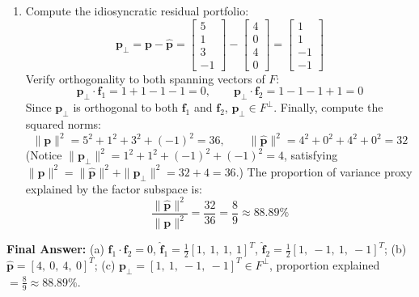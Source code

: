 \documentclass[11pt, letterpaper]{article}
\theoremstyle{definition}
\theoremstyle{remark}
\begin{document}
\begin{enumerate}[label=(\alph*)]
\[    \]
    Adding the two factor components gives the systematic portfolio projection:
    \[
    \hat{\mathbf{p}} = \begin{bmatrix} 2 \\ 2 \\ 2 \\ 2 \end{bmatrix} + \begin{bmatrix} 2 \\ -2 \\ 2 \\ -2 \end{bmatrix} = \begin{bmatrix} 4 \\ 0 \\ 4 \\ 0 \end{bmatrix}
    \]
    \item Compute the idiosyncratic residual portfolio:
    \[
    \mathbf{p}_{\perp} = \mathbf{p} - \hat{\mathbf{p}} = \begin{bmatrix} 5 \\ 1 \\ 3 \\ -1 \end{bmatrix} - \begin{bmatrix} 4 \\ 0 \\ 4 \\ 0 \end{bmatrix} = \begin{bmatrix} 1 \\ 1 \\ -1 \\ -1 \end{bmatrix}
    \]
    Verify orthogonality to both spanning vectors of $F$:
    \[
    \mathbf{p}_{\perp} \cdot \mathbf{f}_1 = 1 + 1 - 1 - 1 = 0, \qquad \mathbf{p}_{\perp} \cdot \mathbf{f}_2 = 1 - 1 - 1 + 1 = 0
    \]
    Since $\mathbf{p}_{\perp}$ is orthogonal to both $\mathbf{f}_1$ and $\mathbf{f}_2$, $\mathbf{p}_{\perp} \in F^{\perp}$. Finally, compute the squared norms:
    \[
    \|\mathbf{p}\|^2 = 5^2 + 1^2 + 3^2 + (-1)^2 = 36, \qquad \|\hat{\mathbf{p}}\|^2 = 4^2 + 0^2 + 4^2 + 0^2 = 32
    \]
    (Notice $\|\mathbf{p}_{\perp}\|^2 = 1^2 + 1^2 + (-1)^2 + (-1)^2 = 4$, satisfying $\|\mathbf{p}\|^2 = \|\hat{\mathbf{p}}\|^2 + \|\mathbf{p}_{\perp}\|^2 = 32 + 4 = 36$.) The proportion of variance proxy explained by the factor subspace is:
    \[
    \frac{\|\hat{\mathbf{p}}\|^2}{\|\mathbf{p}\|^2} = \frac{32}{36} = \frac{8}{9} \approx 88.89\%
    \]
\end{enumerate}
\textbf{Final Answer:} (a) $\mathbf{f}_1 \cdot \mathbf{f}_2 = 0$, $\hat{\mathbf{f}}_1 = \frac{1}{2}[1,\ 1,\ 1,\ 1]^T$, $\hat{\mathbf{f}}_2 = \frac{1}{2}[1,\ -1,\ 1,\ -1]^T$; (b) $\hat{\mathbf{p}} = [4,\ 0,\ 4,\ 0]^T$; (c) $\mathbf{p}_{\perp} = [1,\ 1,\ -1,\ -1]^T \in F^{\perp}$, proportion explained $= \frac{8}{9} \approx 88.89\%$.
\end{document}
